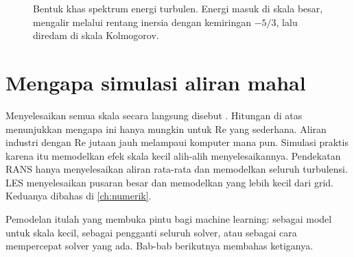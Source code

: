 \begin{figure}[ht]
\centering
{}
\caption{Bentuk khas spektrum energi turbulen. Energi masuk di skala besar, mengalir melalui rentang inersia
dengan kemiringan $-5/3$, lalu diredam di skala Kolmogorov.}
\label{fig:spektrum}
\end{figure}

\section{Mengapa simulasi aliran mahal}

Menyelesaikan semua skala secara langsung disebut . Hitungan di atas
menunjukkan mengapa ini hanya mungkin untuk Re yang sederhana. Aliran industri dengan Re jutaan jauh melampaui
komputer mana pun. Simulasi praktis karena itu memodelkan efek skala kecil alih-alih menyelesaikannya. Pendekatan
RANS hanya menyelesaikan aliran rata-rata dan memodelkan seluruh turbulensi. LES menyelesaikan pusaran besar dan
memodelkan yang lebih kecil dari grid. Keduanya dibahas di \cref{ch:numerik}.

Pemodelan itulah yang membuka pintu bagi machine learning: sebagai model untuk skala kecil, sebagai pengganti
seluruh solver, atau sebagai cara mempercepat solver yang ada. Bab-bab berikutnya membahas ketiganya.

